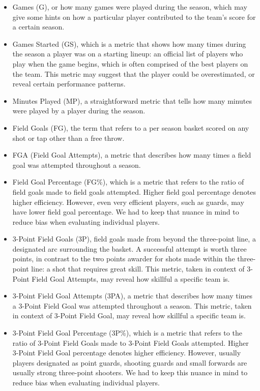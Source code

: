 \documentclass{acm_proc_article-sp}
\begin{document}
\begin{itemize}
\item Games (G), or how many games were played during the season, which may give some hints on how a particular player contributed to the team's score for a certain season.

\item Games Started (GS), which is a metric that shows how many times during the season a player was on a starting lineup: an official list of players who play when the game begins, which is often comprised of the best players on the team. This metric may suggest that the player could be overestimated, or reveal certain performance patterns.
\item Minutes Played (MP), a straightforward metric that tells how many minutes were played by a player during the season.
\item Field Goals (FG), the term that refers to a per season basket scored on any shot or tap other than a free throw.  ~\cite{B} 
\item FGA (Field Goal Attempts), a metric that describes how many times a field goal was attempted throughout a season. 
\item Field Goal Percentage (FG\%),  which is a metric that refers to the ratio of field goals made to field goals attempted. Higher field goal percentage denotes higher efficiency. However, even very efficient players, such as guards, may have lower field goal percentage. We had to keep that nuance in mind to reduce bias when evaluating individual players.
\item 3-Point Field Goals (3P), field goals made from beyond the three-point line, a designated arc surrounding the basket. A successful attempt is worth three points, in contrast to the two points awarder for shots made within the three-point line: a shot that requires great skill. This metric, taken in context of 3-Point Field Goal Attempts, may reveal how skillful a specific team is. 
\item 3-Point Field Goal Attempts (3PA), a metric that describes how many times a 3-Point Field Goal was attempted throughout a season. This metric, taken in context of 3-Point Field Goal, may reveal how skillful a specific team is.
\item 3-Point Field Goal Percentage (3P\%), which is a metric that refers to the ratio of 3-Point Field Goals made to 3-Point Field Goals attempted. Higher 3-Point Field Goal percentage denotes higher efficiency. However, usually players designated as point guards, shooting guards and small forwards are usually strong three-point shooters.  We had to keep this nuance in mind to reduce bias when evaluating individual players.

\end{itemize}
\end{document}
